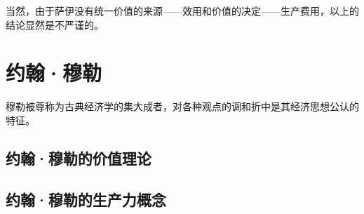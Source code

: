 当然，由于萨伊没有统一价值的来源——效用和价值的决定——生产费用，以上的结论显然是不严谨的。

\section{约翰·穆勒}

 穆勒被尊称为古典经济学的集大成者，对各种观点的调和折中是其经济思想公认的特征\cite[165]{YanZhiJieXiFangJingJiXueShuoShiJiaoChengDiErBan2013}\cite[176-178]{CaiJiMingCongGuDianZhengZhiJingJiXueDaoZhongGuoTeSeSheHuiZhuYiZhengZhiJingJiXueJiYuZhongGuoShiJiaoDeZhengZhiJingJiXueYanBianShangCe2023}。
 
 \subsection{约翰·穆勒的价值理论}

 

 \subsection{约翰·穆勒的生产力概念}
